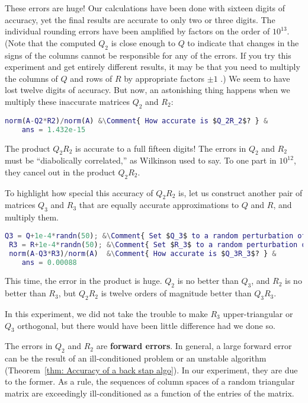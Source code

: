 These errors are huge! Our calculations have been done with sixteen digits of accuracy, yet the final results are accurate to only two or three digits. The individual rounding errors have been amplified by factors on the order of $10^{13}$. (Note that the computed $Q_2$ is close enough to $Q$ to indicate that changes in the signs of the columns cannot be responsible for any of the errors. If you try this experiment and get entirely different results, it may be that you need to multiply the columns of $Q$ and rows of $R$ by appropriate factors $\pm 1$ .)
We seem to have lost twelve digits of accuracy. But now, an astonishing thing happens when we multiply these inaccurate matrices $Q_2$ and $R_2$:

\begin{lstlisting}[language=Matlab]
 norm(A-Q2*R2)/norm(A) &\Comment{ How accurate is $Q_2R_2$? } & 
    ans = 1.432e-15
\end{lstlisting}

The product $Q_2 R_2$ is accurate to a full fifteen digits! The errors in $Q_2$ and $R_2$ must be ``diabolically correlated,'' as Wilkinson used to say. To one part in $10^{12}$, they cancel out in the product $Q_2 R_2$.

To highlight how special this accuracy of $Q_2 R_2$ is, let us construct another pair of matrices $Q_3$ and $R_3$ that are equally accurate approximations to $Q$ and $R$, and multiply them.

\begin{lstlisting}[language=Matlab]
 Q3 = Q+1e-4*randn(50); &\Comment{ Set $Q_3$ to a random perturbation of $Q$ \\ that is closer to $Q$ than $Q_2$ is. } &   
 R3 = R+1e-4*randn(50); &\Comment{ Set $R_3$ to a random perturbation of $R$ \\ that is closer to $R$ than $R_2$ is. } &
 norm(A-Q3*R3)/norm(A)  &\Comment{ How accurate is $Q_3R_3$? } &
    ans = 0.00088
\end{lstlisting}
This time, the error in the product is huge. $Q_2$ is no better than $Q_3$, and $R_2$ is no better than $R_3$, but $Q_2 R_2$ is twelve orders of magnitude better than $Q_3 R_3$.

In this experiment, we did not take the trouble to make $R_3$ upper-triangular or $Q_3$ orthogonal, but there would have been little difference had we done so.

The errors in $Q_2$ and $R_2$ are \textbf{forward errors}. In general, a large forward error can be the result of an ill-conditioned problem or an unstable algorithm (Theorem~\ref{thm: Accuracy of a back stap algo}). In our experiment, they are due to the former. As a rule, the sequences of column spaces of a random triangular matrix are exceedingly ill-conditioned as a function of the entries of the matrix.


